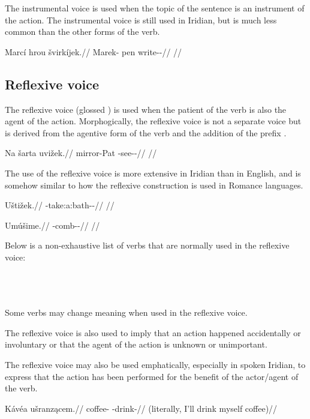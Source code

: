 The instrumental voice is used when the topic of the sentence is an instrument
of the action. The instrumental voice is still used in Iridian, but is much less
common than the other forms of the verb.

\pex
\begingl
\gla Marcí hrou švirkíjek.//
\glb Marek-\Gen{} pen write-\Iv{}-\Pf{}//
\glft {}//
\endgl
\xe


\subsection{Reflexive voice}

The reflexive voice (glossed {\Refl}) is used when the patient of the verb is
also the agent of the action. Morphogically, the reflexive voice is not a
separate voice but is derived from the agentive form of the verb and the
addition of the prefix .

\pex
\begingl
\gla Na šarta uvižek.//
\glb \Loc{} mirror-Pat{} \Refl{}-see-\Av{}-\Pf{}//
\glft {}//
\endgl
\xe

The use of the reflexive voice is more extensive in Iridian than in
English, and is somehow similar to how the reflexive construction
is used in Romance languages.

\pex
\begingl
\gla Uštižek.//
\glb \Refl{}-take:a:bath-\Av{}-\Pf{}//
\glft {}//
\endgl
\xe

\pex
\begingl
\gla Umúšime.//
\glb \Refl{}-comb-\Av{}-\Prog{}//
\glft {}//
\endgl
\xe

Below is a non-exhaustive list of verbs that are normally used in the reflexive
voice:
\bigskip

\noindent
{} \\
 \\
 \\

Some verbs may change meaning when used in the reflexive voice.


The reflexive voice is also used to imply that an action happened accidentally
or involuntary or that the agent of the action is unknown or unimportant.

The reflexive voice may also be used emphatically, especially in spoken Iridian,
to express that the action has been performed for the benefit of the actor/agent
of the verb.

\pex
\begingl
\gla Kávéa ušranzącem.//
\glb coffee-\Acc{} \Refl{}-drink-//
\glft {} (literally, I'll drink myself coffee)//
\endgl
\xe


